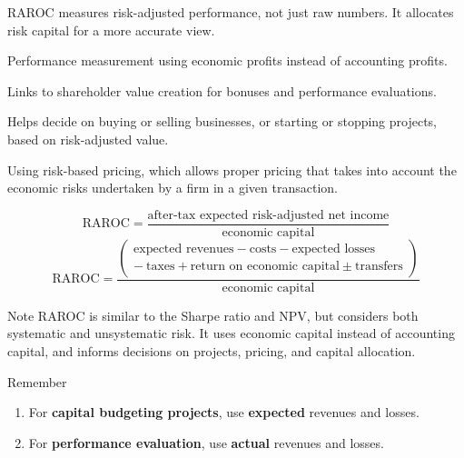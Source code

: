 
RAROC measures risk-adjusted performance, not just raw numbers. It allocates risk
capital for a more accurate view.


\begin{lettered}
\item Performance measurement using economic profits instead of accounting
profits.
\item Links to shareholder value creation for bonuses and performance evaluations.
\item Helps decide on buying or selling businesses, or starting or stopping
projects, based on risk-adjusted value.
\item Using risk-based pricing, which allows proper pricing that takes into account
the economic risks undertaken by a firm in a given transaction.
\end{lettered}



\begin{orkeybox}
\[
\mathrm{RAROC}=\frac{\text{after-tax expected risk-adjusted net income}}
                    {\text{economic capital}}
\]
\vspace{2pt}
\[
\mathrm{RAROC}=\frac{\left(\begin{array}{c}
\text{expected revenues}-\text{costs}-\text{expected losses}\\
-\ \text{taxes}+\text{return on economic capital}\pm\text{transfers}
\end{array}\right)}{\text{economic capital}}
\]
\end{orkeybox}

\begin{ornotebox}{Note}
RAROC is similar to the Sharpe ratio and NPV, but considers both systematic and
unsystematic risk. It uses economic capital instead of accounting capital, and
informs decisions on projects, pricing, and capital allocation.
\end{ornotebox}

\begin{ornotebox}{Remember}
\begin{enumerate}
\item[\textcolor{gold}{\sffamily\bfseries 1)}] For \textbf{capital budgeting
projects}, use \textbf{expected} revenues and losses.
\item[\textcolor{gold}{\sffamily\bfseries 2)}] For \textbf{performance
evaluation}, use \textbf{actual} revenues and losses.
\end{enumerate}
\end{ornotebox}

